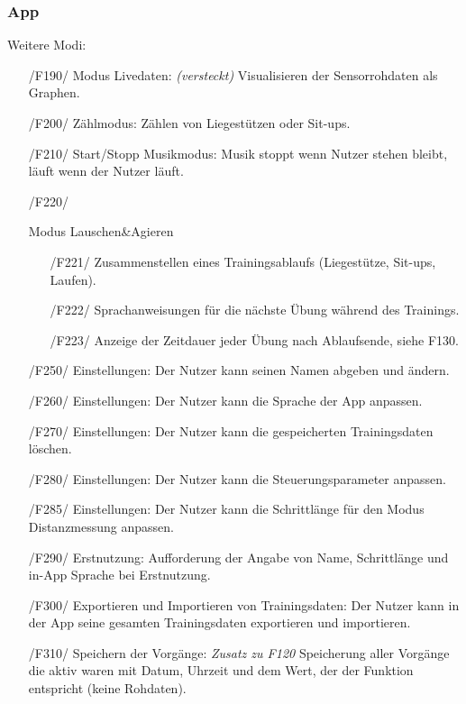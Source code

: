 \documentclass[a4paper,12pt]{article}
\begin{document}
    \subsubsection{App}
      Weitere Modi:
      \begin{itemize}
      \item[/F190/] \textsf{Modus Livedaten: \textit{(versteckt)}} Visualisieren der Sensorrohdaten als Graphen.
      \item[/F200/] \textsf{Zählmodus:} Zählen von Liegestützen oder Sit-ups. %
      \item[/F210/] \textsf{Start/Stopp Musikmodus:} Musik stoppt wenn Nutzer stehen bleibt, läuft wenn der Nutzer läuft.
      \item[/F220/]{
        Modus \glqq Lauschen\&Agieren\grqq
        \begin{itemize}
          \item[/F221/] Zusammenstellen eines Trainingsablaufs (Liegestütze, Sit-ups, Laufen). 
          \item[/F222/] Sprachanweisungen für die nächste Übung während des Trainings.
          \item[/F223/] Anzeige der Zeitdauer jeder Übung nach Ablaufsende, siehe F130.
        \end{itemize}
      }
      \item[/F250/] \textsf {Einstellungen:} Der Nutzer kann seinen Namen abgeben und ändern.
      \item[/F260/] \textsf {Einstellungen:} Der Nutzer kann die Sprache der App anpassen.
      \item[/F270/] \textsf {Einstellungen:} Der Nutzer kann die gespeicherten Trainingsdaten löschen.
      \item[/F280/] \textsf {Einstellungen:} Der Nutzer kann die Steuerungsparameter anpassen. %
      \item[/F285/] \textsf {Einstellungen:} Der Nutzer kann die Schrittlänge für den Modus Distanzmessung anpassen.%
      \item[/F290/] \textsf {Erstnutzung:} Aufforderung der Angabe von Name, Schrittlänge und in-App Sprache bei Erstnutzung.
      \item[/F300/] \textsf{Exportieren und Importieren von Trainingsdaten:} Der Nutzer kann in der App seine gesamten Trainingsdaten exportieren und importieren.
      \item[/F310/] \textsf{Speichern der Vorgänge: \textit{Zusatz zu F120}} Speicherung aller Vorgänge die aktiv waren mit Datum, Uhrzeit und dem Wert, der der Funktion entspricht (keine Rohdaten).   %
      \end{itemize}
\end{document}
